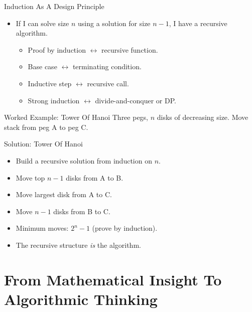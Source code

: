 \documentclass{beamer}
\begin{document}
\begin{frame}{Induction As A Design Principle}
    \pause
    \begin{itemize}
        \item If I can solve size $n$ using a solution for size $n-1$,
            I have a recursive algorithm.
            \begin{itemize}
                \item Proof by induction $\leftrightarrow$ recursive function.
                \item Base case $\leftrightarrow$ terminating condition.
                \item Inductive step $\leftrightarrow$ recursive call.
                \item Strong induction $\leftrightarrow$ divide-and-conquer or DP.
            \end{itemize}
    \end{itemize}
\end{frame}

\begin{frame}{Worked Example: Tower Of Hanoi}
    Three pegs, $n$ disks of decreasing size. Move stack from peg A to peg C.
\end{frame}

\begin{frame}{Solution: Tower Of Hanoi}
    \pause
    \begin{itemize}
        \item Build a recursive solution from induction on $n$.
        \item Move top $n-1$ disks from A to B.
        \item Move largest disk from A to C.
        \item Move $n-1$ disks from B to C.
        \item Minimum moves: $2^n-1$ (prove by induction).
        \item The recursive structure \emph{is} the algorithm.
    \end{itemize}
\end{frame}

\section{From Mathematical Insight To Algorithmic Thinking}
\end{document}
